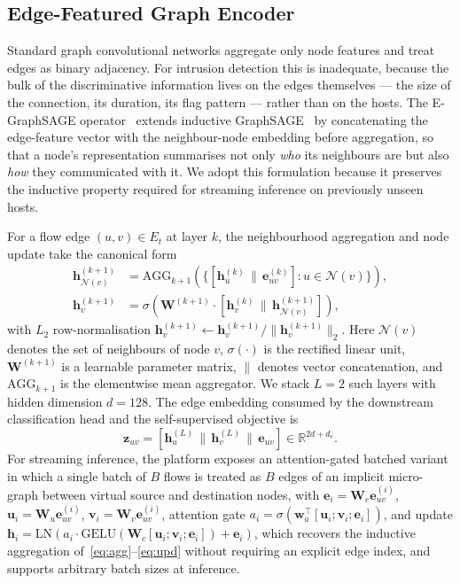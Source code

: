 \documentclass{ieeeaccess}
\begin{document}
\subsection{Edge-Featured Graph Encoder}
\label{sec:method:encoder}
Standard graph convolutional networks aggregate only node features and
treat edges as binary adjacency. For intrusion detection this is
inadequate, because the bulk of the discriminative information lives on
the edges themselves --- the size of the connection, its duration, its
flag pattern --- rather than on the hosts. The E-GraphSAGE
operator~\cite{lo2022egraphsage} extends inductive
GraphSAGE~\cite{hamilton2017graphsage} by concatenating the edge-feature
vector with the neighbour-node embedding before aggregation, so that a
node's representation summarises not only \emph{who} its neighbours are
but also \emph{how} they communicated with it. We adopt this formulation
because it preserves the inductive property required for streaming
inference on previously unseen hosts.

For a flow edge $(u,v) \in E_t$ at layer $k$, the neighbourhood
aggregation and node update take the canonical form
\begin{align}
\mathbf{h}_{\mathcal{N}(v)}^{(k+1)} &= \mathrm{AGG}_{k+1}\!\left(\{[\mathbf{h}_u^{(k)} \,\|\, \mathbf{e}_{uv}^{(k)}] : u \in \mathcal{N}(v)\}\right), \label{eq:agg}\\
\mathbf{h}_v^{(k+1)} &= \sigma\!\left(\mathbf{W}^{(k+1)} \cdot [\mathbf{h}_v^{(k)} \,\|\, \mathbf{h}_{\mathcal{N}(v)}^{(k+1)}]\right), \label{eq:upd}
\end{align}
with $L_2$ row-normalisation $\mathbf{h}_v^{(k+1)} \leftarrow
\mathbf{h}_v^{(k+1)}/\|\mathbf{h}_v^{(k+1)}\|_2$. Here
$\mathcal{N}(v)$ denotes the set of neighbours of node $v$,
$\sigma(\cdot)$ is the rectified linear unit, $\mathbf{W}^{(k+1)}$ is a
learnable parameter matrix, $\|$ denotes vector concatenation, and
$\mathrm{AGG}_{k+1}$ is the elementwise mean aggregator. We stack
$L = 2$ such layers with hidden dimension $d = 128$. The edge embedding
consumed by the downstream classification head and the self-supervised
objective is
\begin{equation}
\mathbf{z}_{uv} = [\mathbf{h}_u^{(L)} \,\|\, \mathbf{h}_v^{(L)} \,\|\, \mathbf{e}_{uv}] \in \mathbb{R}^{2d + d_e}.
\label{eq:zedge}
\end{equation}
For streaming inference, the platform exposes an attention-gated batched
variant in which a single batch of $B$ flows is treated as $B$ edges of an
implicit micro-graph between virtual source and destination nodes, with
$\mathbf{e}_i = \mathbf{W}_e \mathbf{e}_{uv}^{(i)}$,
$\mathbf{u}_i = \mathbf{W}_u \mathbf{e}_{uv}^{(i)}$,
$\mathbf{v}_i = \mathbf{W}_v \mathbf{e}_{uv}^{(i)}$,
attention gate $a_i = \sigma(\mathbf{w}_a^\top[\mathbf{u}_i; \mathbf{v}_i; \mathbf{e}_i])$,
and update
$\mathbf{h}_i = \mathrm{LN}(a_i \cdot \mathrm{GELU}(\mathbf{W}_c[\mathbf{u}_i; \mathbf{v}_i; \mathbf{e}_i]) + \mathbf{e}_i)$,
which recovers the inductive aggregation of~\eqref{eq:agg}--\eqref{eq:upd}
without requiring an explicit edge index, and supports arbitrary batch
sizes at inference.
\end{document}
